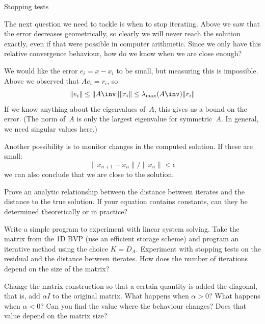 
 {Stopping tests}

The next question we need to tackle is when to stop iterating. Above
we saw that the error decreases geometrically, so clearly we will
never reach the solution exactly, even if that were possible in
computer arithmetic. Since we only have this relative convergence
behaviour, how do we know when we are close enough?

We would like the error $e_i=x-x_i$ to be small, but measuring this is
impossible. Above we observed that $Ae_i=r_i$, so
\[ \|e_i\|\leq \|A\inv\|\|r_i\| 
    \leq \lambda_{\max}(A\inv)\|r_i\|
\]
If we know anything about the eigenvalues of~$A$, this gives us a
bound on the error. (The norm of~$A$ is only the largest eigenvalue
for symmetric~$A$. In general, we need singular values here.)

Another possibility is to monitor changes in the computed solution. If
these are small:
    \[ \| x_{n+1}-x_n\|/\|x_n\|<\epsilon \]
we can also conclude that we are close to the solution.

\begin{exercise}
  Prove an analytic relationship between the distance between iterates
  and the distance to the true solution. If your equation contains
  constants, can they be determined theoretically or in practice?
\end{exercise}

\begin{exercise}
    Write a simple program to experiment with linear system
    solving. Take the matrix from the 1D BVP (use an efficient storage
    scheme) and program an iterative
    method using the choice $K=D_A$. Experiment with stopping tests on
    the residual and the distance between iterates.
    How does the number of iterations
    depend on the size of the matrix?

    Change the matrix construction so that a certain quantity is
    added the diagonal, that is, add $\alpha I$ to the original
    matrix. What happens when $\alpha>0$? What happens when
    $\alpha<0$? Can you find the value where the behaviour changes?
    Does that value depend on the matrix size?
\end{exercise}
